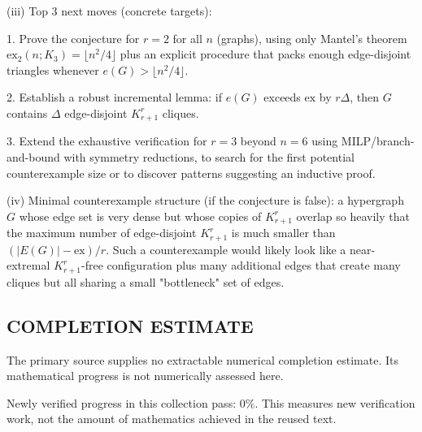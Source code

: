 (iii) Top 3 next moves (concrete targets):

1. Prove the conjecture for $r=2$ for all $n$ (graphs), using only Mantel's theorem $\mathrm{ex}_2(n;K_3)=\lfloor n^2/4\rfloor$ plus an explicit procedure that packs enough edge-disjoint triangles whenever $e(G)>\lfloor n^2/4\rfloor$.

2. Establish a robust incremental lemma: if $e(G)$ exceeds $\mathrm{ex}$ by $r\Delta$, then $G$ contains $\Delta$ edge-disjoint $K_{r+1}^r$ cliques.

3. Extend the exhaustive verification for $r=3$ beyond $n=6$ using MILP/branch-and-bound with symmetry reductions, to search for the first potential counterexample size or to discover patterns suggesting an inductive proof.

(iv) Minimal counterexample structure (if the conjecture is false): a hypergraph $G$ whose edge set is very dense but whose copies of $K_{r+1}^r$ overlap so heavily that the maximum number of edge-disjoint $K_{r+1}^r$ is much smaller than $(|E(G)|-\mathrm{ex})/r$. Such a counterexample would likely look like a near-extremal $K_{r+1}^r$-free configuration plus many additional edges that create many cliques but all sharing a small "bottleneck" set of edges.



\subsection*{COMPLETION ESTIMATE}
The primary source supplies no extractable numerical completion estimate. Its mathematical progress is not numerically assessed here.

Newly verified progress in this collection pass: $0\%$. This measures new verification work, not the amount of mathematics achieved in the reused text.

